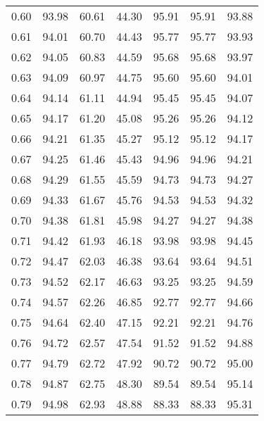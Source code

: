 \begin{tabular}{|c|c|c|c|c|c|c|}
      0.60 &     93.98 &     60.61 &      44.30 &   95.91 &      95.91 &         93.88 \\
      0.61 &     94.01 &     60.70 &      44.43 &   95.77 &      95.77 &         93.93 \\
      0.62 &     94.05 &     60.83 &      44.59 &   95.68 &      95.68 &         93.97 \\
      0.63 &     94.09 &     60.97 &      44.75 &   95.60 &      95.60 &         94.01 \\
      0.64 &     94.14 &     61.11 &      44.94 &   95.45 &      95.45 &         94.07 \\
      0.65 &     94.17 &     61.20 &      45.08 &   95.26 &      95.26 &         94.12 \\
      0.66 &     94.21 &     61.35 &      45.27 &   95.12 &      95.12 &         94.17 \\
      0.67 &     94.25 &     61.46 &      45.43 &   94.96 &      94.96 &         94.21 \\
      0.68 &     94.29 &     61.55 &      45.59 &   94.73 &      94.73 &         94.27 \\
      0.69 &     94.33 &     61.67 &      45.76 &   94.53 &      94.53 &         94.32 \\
      0.70 &     94.38 &     61.81 &      45.98 &   94.27 &      94.27 &         94.38 \\
      0.71 &     94.42 &     61.93 &      46.18 &   93.98 &      93.98 &         94.45 \\
      0.72 &     94.47 &     62.03 &      46.38 &   93.64 &      93.64 &         94.51 \\
      0.73 &     94.52 &     62.17 &      46.63 &   93.25 &      93.25 &         94.59 \\
      0.74 &     94.57 &     62.26 &      46.85 &   92.77 &      92.77 &         94.66 \\
      0.75 &     94.64 &     62.40 &      47.15 &   92.21 &      92.21 &         94.76 \\
      0.76 &     94.72 &     62.57 &      47.54 &   91.52 &      91.52 &         94.88 \\
      0.77 &     94.79 &     62.72 &      47.92 &   90.72 &      90.72 &         95.00 \\
      0.78 &     94.87 &     62.75 &      48.30 &   89.54 &      89.54 &         95.14 \\
      0.79 &     94.98 &     62.93 &      48.88 &   88.33 &      88.33 &         95.31 \\

\end{tabular}
